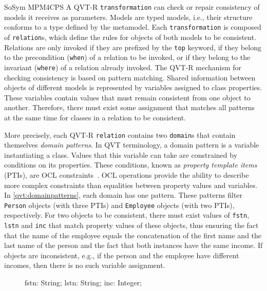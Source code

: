 \begin{copiedFrom}{SoSym MPM4CPS}
A QVT-R \texttt{transformation} can check or repair consistency of models it receives as parameters. Models are typed models, i.e., their structure conforms to a type defined by the metamodel. Each \texttt{transformation} is composed of \texttt{relation}s, which define the rules for objects of both models to be consistent. Relations are only invoked if they are prefixed by the \texttt{top} keyword, if they belong to the precondition (\texttt{when}) of a relation to be invoked, or if they belong to the invariant (\texttt{where}) of a relation already invoked. The QVT-R mechanism for checking consistency is based on pattern matching. Shared information between objects of different models is represented by variables assigned to class properties. These variables contain values that must remain consistent from one object to another. Therefore, there must exist some assignment that matches all patterns at the same time for classes in a relation to be consistent. 

More precisely, each QVT-R \texttt{relation} contains two \texttt{domain}s that contain themselves \textit{domain patterns}. In QVT terminology, a domain pattern is a variable instantiating a class. Values that this variable can take are constrained by conditions on its properties. These conditions, known as \textit{property template items} (PTIs), are OCL constraints~\cite{ocl}. OCL operations provide the ability to describe more complex constraints than equalities between property values and variables. In \autoref{qvt:domainpatterns}, each domain has one pattern. These patterns filter \texttt{Person} objects (with three PTIs) and \texttt{Employee} objects (with two PTIs), respectively. For two objects to be consistent, there must exist values of \texttt{fstn}, \texttt{lstn} and \texttt{inc} that match property values of these objects, thus ensuring the fact that the name of the employee equals the concatenation of the first name and the last name of the person and the fact that both instances have the same income. If objects are inconsistent, e.g., if the person and the employee have different incomes, then there is no such variable assignment.

\begin{figure}
\begin{embeddedqvtcode}[frame=bt, numbers=none, mathescape=true, caption={Two domains, each with one domain pattern. Taken from \owncite{klare2020compatibility-report}.},label={qvt:domainpatterns},captionpos=b]
fstn: String; lstn: String;
inc: Integer;


\end{embeddedqvtcode}
\end{figure}
\end{copiedFrom}
